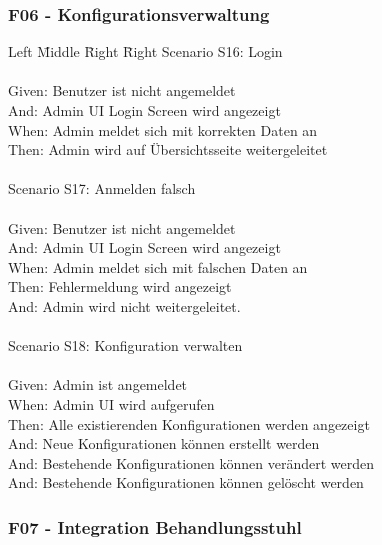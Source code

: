 \subsubsection*{F06 - Konfigurationsverwaltung}
\begin{tabbing}
    Left \= Middle \= Right \= Right  \kill
    Scenario S16: \> \> \>  Login\\ \\
    Given: \> \> \>  Benutzer ist nicht angemeldet\\
    And: \> \> \>    Admin UI Login Screen wird angezeigt\\
    When: \> \> \>   Admin meldet sich mit korrekten Daten an\\
    Then: \> \> \>   Admin wird auf Übersichtsseite weitergeleitet\\ \\

    Scenario S17: \> \> \>  Anmelden falsch\\ \\
    Given: \> \> \>  Benutzer ist nicht angemeldet\\
    And: \> \> \>    Admin UI Login Screen wird angezeigt\\
    When: \> \> \>   Admin meldet sich mit falschen Daten an\\
    Then: \> \> \>   Fehlermeldung wird angezeigt\\
    And: \> \> \>   Admin wird nicht weitergeleitet.\\ \\

    Scenario S18: \> \> \>  Konfiguration verwalten \\ \\
    Given: \> \> \>  Admin ist angemeldet\\
    When: \> \> \>  Admin UI wird aufgerufen\\
    Then: \> \> \>  Alle existierenden Konfigurationen werden angezeigt\\
    And: \> \> \>  Neue Konfigurationen können erstellt werden\\
    And: \> \> \>  Bestehende Konfigurationen können verändert werden\\
    And: \> \> \>  Bestehende Konfigurationen können gelöscht werden\\
\end{tabbing}

\subsubsection*{F07 - Integration Behandlungsstuhl}

